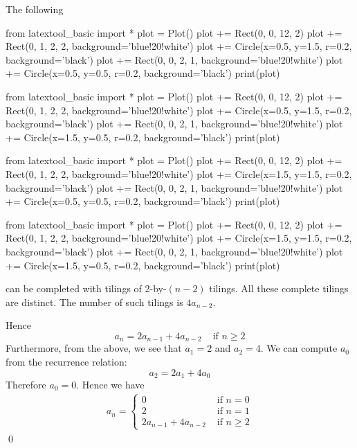 The following
\begin{python}
from latextool_basic import *
plot = Plot()
plot += Rect(0, 0, 12, 2)
plot += Rect(0, 1, 2, 2, background='blue!20!white')
plot += Circle(x=0.5, y=1.5, r=0.2, background='black')
plot += Rect(0, 0, 2, 1, background='blue!20!white')
plot += Circle(x=0.5, y=0.5, r=0.2, background='black')
print(plot)
\end{python}
\begin{python}
from latextool_basic import *
plot = Plot()
plot += Rect(0, 0, 12, 2)
plot += Rect(0, 1, 2, 2, background='blue!20!white')
plot += Circle(x=0.5, y=1.5, r=0.2, background='black')
plot += Rect(0, 0, 2, 1, background='blue!20!white')
plot += Circle(x=1.5, y=0.5, r=0.2, background='black')
print(plot)
\end{python}
\begin{python}
from latextool_basic import *
plot = Plot()
plot += Rect(0, 0, 12, 2)
plot += Rect(0, 1, 2, 2, background='blue!20!white')
plot += Circle(x=1.5, y=1.5, r=0.2, background='black')
plot += Rect(0, 0, 2, 1, background='blue!20!white')
plot += Circle(x=0.5, y=0.5, r=0.2, background='black')
print(plot)
\end{python}
\begin{python}
from latextool_basic import *
plot = Plot()
plot += Rect(0, 0, 12, 2)
plot += Rect(0, 1, 2, 2, background='blue!20!white')
plot += Circle(x=1.5, y=1.5, r=0.2, background='black')
plot += Rect(0, 0, 2, 1, background='blue!20!white')
plot += Circle(x=1.5, y=0.5, r=0.2, background='black')
print(plot)
\end{python}
can be completed with tilings of 2-by-$(n-2)$ tilings.
All these complete tilings are distinct.
The number of such tilings is $4 a_{n-2}$.

Hence
\[
a_n = 2 a_{n-1} + 4 a_{n-2} \,\,\,\,\, \text{ if } n \geq 2
\]
Furthermore, from the above, we see that $a_1 = 2$ and $a_2 = 4$.
We can compute $a_0$ from the recurrence relation:
\[
a_2 = 2 a_{1} + 4 a_{0}
\]
Therefore
$a_0 = 0$.
Hence we have
\begin{align*}
  a_n =
  \begin{cases}
    0                   & \text{ if } n = 0 \\
    2                   & \text{ if } n = 1 \\
    2 a_{n-1} + 4 a_{n-2} & \text{ if } n \geq 2
  \end{cases}
\end{align*}
\qed

\newpage
\newpage
\newpage
\newpage



